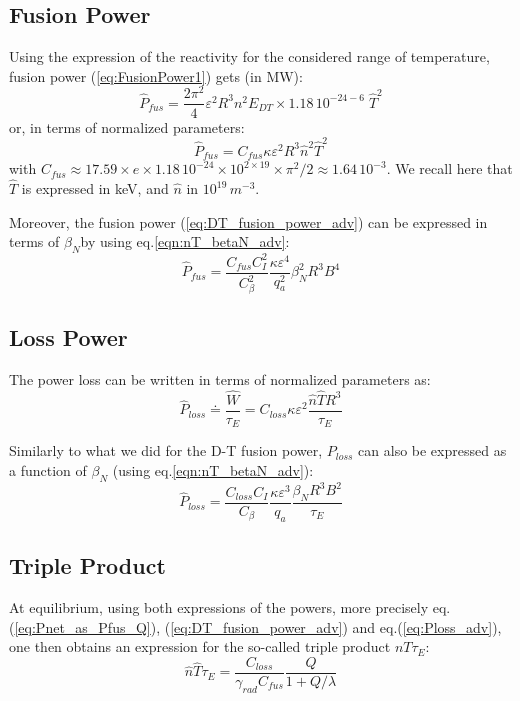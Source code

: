 \subsection{Fusion Power}
Using the expression of the reactivity for the considered range of temperature, fusion power (\ref{eq:FusionPower1}) gets (in MW):
\begin{equation}
\hat P_{fus} 
=
\frac{2\pi^2}{4}
\varepsilon^2 R^3
n^2 E_{DT}
\times
1.18\, 10^{-24-6}\; \hat T^2 
\end{equation}
or, in terms of normalized parameters:
\begin{equation}
	\hat P_{fus} 
	=
	C_{fus} \kappa \varepsilon^2 R^3 \hat n^2 \hat T^2  
\label{eq:DT_fusion_power_adv}
\end{equation}
with $C_{fus} \approx 17.59 \times e\times 1.18\, 10^{-24} \times 10^{2\times19}\times \pi^2/2 \approx 1.64\, 10^{-3}$. We recall here that $\hat T$ is expressed in keV, and $\hat n$ in $10^{19} \, \si{m^{-3}}$. 



Moreover, the fusion power (\ref{eq:DT_fusion_power_adv}) can be expressed in terms of $\beta_N$by using eq.\ref{eqn:nT_betaN_adv}:
\begin{equation}
	\hat P_{fus} 
	= 
	\frac{C_{fus}C_I^2}{C_\beta^2} \frac{\kappa \varepsilon^4}{q_a^2} 
	\beta_N^2 R^3 B^4 
\label{eq:DT_fusion_power_betaN_adv}
\end{equation}

\subsection{Loss Power}
The power loss can be written in terms of normalized parameters as:
\begin{equation}
	\hat P_{loss} \doteq \frac{\hat W}{\tau_E} 
	= C_{loss} \kappa \varepsilon^2  \frac{\hat n \hat T R^3}{\tau_E}
\label{eq:Ploss_adv}
\end{equation}

Similarly to what we did for the D-T fusion power, $P_{loss}$ can also be expressed as a function of $\beta_N$ (using eq.\ref{eqn:nT_betaN_adv}):
\begin{equation}
	\hat P_{loss} 
	= 
	\frac{C_{loss}C_I}{C_\beta}  \frac{\kappa \varepsilon^3}{q_a}
	\frac{\beta_N R^3 B^2}{\tau_E}
\label{eq:Ploss_betaN_adv}
\end{equation}

\subsection{Triple Product}
At equilibrium, using both expressions of the powers, more precisely eq.(\ref{eq:Pnet_as_Pfus_Q}), (\ref{eq:DT_fusion_power_adv}) and eq.(\ref{eq:Ploss_adv}), one then obtains an expression for the so-called triple product $nT\tau_E$:
\begin{equation}
	\hat n \hat T \tau_E = \frac{C_{loss}}{\gamma_{rad} C_{fus}} \frac{Q}{1+Q/\lambda}
\label{eq:nTtau_Q_adv}
\end{equation}


